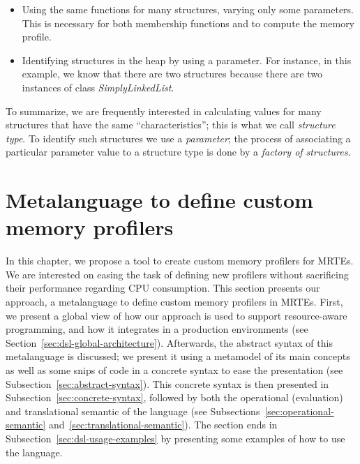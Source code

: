 \begin{itemize}
\item Using the same functions for many structures, varying only some parameters. This is necessary for both membership functions and to compute the memory profile.

\item Identifying structures in the heap by using a parameter. For instance, in this example, we know that there are two structures because there are two instances of class \textit{SimplyLinkedList}.
\end{itemize}

To summarize, we are frequently interested in calculating values for many structures that have the same ``characteristics''; this is what we call \textit{structure type}.
To identify such structures we use a \textit{parameter}; the process of associating a particular parameter value to a structure type is done by a \textit{factory of structures}. 

\section{Metalanguage to define custom memory profilers}\label{sec:approach}

In this chapter, we propose a tool to create custom memory profilers for MRTEs.
We are interested on easing the task of defining new profilers without sacrificing their performance regarding CPU consumption.
This section presents our approach, a metalanguage to define custom memory profilers in MRTEs.
First, we present a global view of how our approach is used to support resource-aware programming, and how it integrates in a production environments (see Section~\ref{sec:dsl-global-architecture}).
Afterwards, the abstract syntax of this metalanguage is discussed; we present it using a metamodel of its main concepts as well as some snips of code in a concrete syntax to ease the presentation (see Subsection~\ref{sec:abstract-syntax}).
This concrete syntax is then presented in Subsection~\ref{sec:concrete-syntax}, followed by both the operational (evaluation) and translational semantic of the language (see Subsections~\ref{sec:operational-semantic} and~\ref{sec:translational-semantic}).
The section ends in Subsection~\ref{sec:dsl-usage-examples} by presenting some examples of how to use the language.


